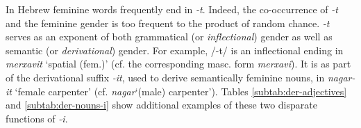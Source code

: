 In Hebrew %
feminine words frequently 
end in \textit{-t}. Indeed, the co-occurrence of \textit{-t} and the feminine gender is 
too frequent to the product of random chance. 
\textit{-t} serves as an exponent of both grammatical (or \emph{inflectional}) 
gender as well as semantic (or \emph{derivational}) gender. For example, /-t/ 
is an inflectional ending in \textit{merxavit} `spatial (fem.)' (cf. the 
corresponding masc. form \textit{merxavi}). 
It is as part of the derivational suffix \textit{-it}, used to derive semantically feminine 
nouns, in \textit{nagar-it} `female carpenter' 
(cf. \textit{nagar}`(male) carpenter'). 
Tables 
\ref{subtab:der-adjectives} and \ref{subtab:der-nouns-i} show additional
examples of these two disparate functions of \textit{-i}.


